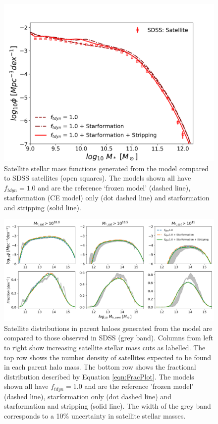 \begin{figure}
	\centering
	\includegraphics[width = \linewidth]{Figures/Chapter3/Fig11.png}
	\caption{Satellite stellar mass functions generated from the model compared to SDSS satellites (open squares). The models shown all have $f_{tdyn} = 1.0$ and are the reference `frozen model' (dashed line), starformation (CE model) only (dot dashed line) and starformation and stripping (solid line).}
	\label{fig:SMF_SF_Strip}
\end{figure}

\begin{figure}
	\centering
	\includegraphics[width = \linewidth]{Figures/Chapter3/Sat_Dist_SF_Strip.png}
	\caption{Satellite distributions in parent haloes generated from the model are compared to those observed in SDSS (grey band). Columns from left to right show increasing satellite stellar mass cuts as labelled. The top row shows the number density of satellites expected to be found in each parent halo mass. The bottom row shows the fractional distribution described by Equation \ref{eqn:FracPlot}. The models shown all have $f_{tdyn} = 1.0$ and are the reference 'frozen model' (dashed line), starformation only (dot dashed line) and starformation and stripping (solid line). The width of the grey band corresponds to a 10\% uncertainty in satellite stellar masses.}
	\label{fig:Sat_Dist_SF_Strip}
\end{figure}

